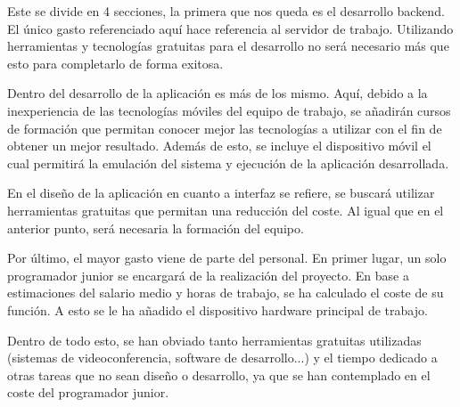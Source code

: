 Este se divide en 4 secciones, la primera que nos queda es el desarrollo backend. El único gasto referenciado aquí hace referencia al servidor de trabajo. Utilizando herramientas y tecnologías gratuitas para el desarrollo no será necesario más que esto para completarlo de forma exitosa. 

Dentro del desarrollo de la aplicación es más de los mismo. Aquí, debido a la inexperiencia de las tecnologías móviles del equipo de trabajo, se añadirán cursos de formación que permitan conocer mejor las tecnologías a utilizar con el fin de obtener un mejor resultado. Además de esto, se incluye el dispositivo móvil el cual permitirá la emulación del sistema y ejecución de la aplicación desarrollada.

En el diseño de la aplicación en cuanto a interfaz se refiere, se buscará utilizar herramientas gratuitas que permitan una reducción del coste. Al igual que en el anterior punto, será necesaria la formación del equipo.

Por último, el mayor gasto viene de parte del personal. En primer lugar, un solo programador junior se encargará de la realización del proyecto. En base a estimaciones del salario medio \cite{glassdor-2021} y horas de trabajo, se ha calculado el coste de su función. A esto se le ha añadido el dispositivo hardware principal de trabajo. 

Dentro de todo esto, se han obviado tanto herramientas gratuitas utilizadas (sistemas de videoconferencia, software de desarrollo...) y el tiempo dedicado a otras tareas que no sean diseño o desarrollo, ya que se han contemplado en el coste del programador junior.


